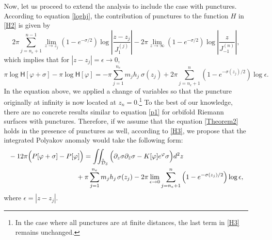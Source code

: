 \documentclass[a4paper,11pt]{article}
\newcommand{\singfund}{\overset{{}_{\curlywedge}}{\mathcal{D}}}
\begin{document}
Now, let us proceed to extend the analysis to include the case with punctures. According to equation \eqref{loghj}, the contribution of punctures to the function $H$ in \eqref{H2} is given by
\begin{equation}
 2\pi\sum_{j=n_e+1}^{n-1}\lim_{z\rightarrow z_j}\left(1-e^{-\sigma/2}\right)\log \left|\frac{z-z_j}{J_{1}^{(j)}}\right|-2\pi\lim_{z\rightarrow\infty}\left(1-e^{-\sigma/2}\right)\log\left|\frac{z}{J_{-1}^{(n)}}\right|,
\end{equation}
which implies that for $|z-z_j|=\epsilon\rightarrow 0$,
\begin{equation}
\pi \log \mathsf{H}[\varphi+\sigma]-\pi \log \mathsf{H}[\varphi] = -\pi \sum_{j=1}^{n_e} m_j h_j~ \sigma(z_j)+2\pi\sum_{j=n_e+1}^{n}\left(1-e^{-\sigma(z_j)/2}\right)\log \epsilon.\label{H3}
\end{equation}
In the equation above, we applied a change of variables so that the puncture originally at infinity is now located at $z_n=0$.\footnote{In the case where all punctures are at finite distances, the last term in \eqref{H3} remains unchanged.} To the best of our knowledge, there are no concrete results similar to equation \eqref{p1} for  orbifold Riemann surfaces with punctures. Therefore, if we assume that the equation \eqref{Theorem2} holds in the presence of punctures as well, according to \eqref{H3}, we propose that the integrated Polyakov anomaly would take the following form:
\begin{equation}
\begin{split}
&-12\pi\Big(P[\varphi+\sigma]-P[\varphi]\Big)
=\iint_{\singfund_{\delta}}\Big( \partial_{z}\sigma\partial_{\bar{z}}\sigma   -K[\varphi] e^{\varphi}\sigma\Big) d^{2}z\\&\hspace{3.5cm}+ \pi\sum_{j=1}^{n_e}m_j h_j\hspace{.5mm}\sigma(z_j)-2\pi\lim_{\epsilon\rightarrow 0}\sum_{j=n_e+1}^{n}\left(1-e^{-\sigma(z_j)/2}\right)\log \epsilon,\label{p4}
\end{split}
\end{equation}
where $\epsilon= |z-z_j|$.
\end{document}
